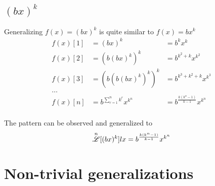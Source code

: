 \documentclass[12pt, letterpaper]{article}
\begin{document}
\subsection{$(bx)^k$}
Generalizing {$f(x) = (bx)^{k}$} is quite similar to {$f(x) = bx^k$}
\begin{align*}
    f(x)[1] &= (bx)^{k}             &= b^{k}x^{k} \\
    f(x)[2] &= (b(bx)^{k})^{k}       &= b^{k^{2}+k}x^{k^{2}} \\
    f(x)[3] &= (b(b(bx)^{k})^{k})^{k} &= b^{k^{3} + k^{2} + k} x^{k^{3}} \\
       \dots \\
    f(x)[n] &= b^{\sum_{r=1}^{n} k^{r}} x^{k^{n}}  &= b^{\frac{k(k^{n}-1)}{k-1}}x^{k^{n}}
\end{align*}
\\The pattern can be observed and generalized to
$$\overset{n}{\mathscr{L}} [(bx)^k] lx = b^{\frac{k(k^{n}-1)}{k-1}}x^{k^{n}}$$

\newpage
\section{Non-trivial generalizations}
\end{document}
